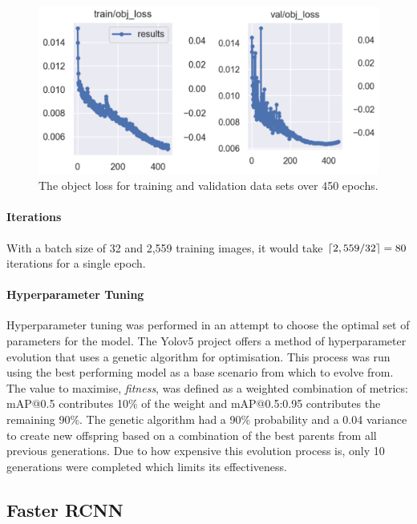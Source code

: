 \documentclass{thesis}
\begin{document}
\begin{figure}[h]
    \centering
    \includegraphics[scale=0.5]{images/train-val-obj-loss.png}
    \caption{The object loss for training and validation data sets over 450 epochs.}
    \label{fig:epochs}
\end{figure}

\paragraph{Iterations} 

With a batch size of 32 and 2,559 training images, it would take $\lceil2,559 / 32\rceil = 80$ iterations for a single epoch.

\paragraph{Hyperparameter Tuning}

Hyperparameter tuning was performed in an attempt to choose the optimal set of parameters for the model. The Yolov5 project offers a method of hyperparameter evolution that uses a genetic algorithm for optimisation. This process was run using the best performing model as a base scenario from which to evolve from. The value to maximise, \textit{fitness}, was defined as a weighted combination of metrics: mAP@0.5 contributes 10\% of the weight and mAP@0.5:0.95 contributes the remaining 90\%. The genetic algorithm had a 90\% probability and a 0.04 variance to create new offspring based on a combination of the best parents from all previous generations. Due to how expensive this evolution process is, only 10 generations were completed which limits its effectiveness.

\subsection{Faster RCNN}
\end{document}
